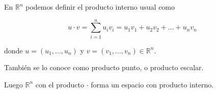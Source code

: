 \begin{example}

En $ \mathbb{R}^n$ podemos definir el producto interno usual como

$$ u \cdot v = \sum_{i=1}^n u_i v_i = u_1 v_1 + u_2 v_2 + \ldots + u_n v_n$$

donde $ u=(u_1, \ldots, u_n)$ y $ v = (v_1, \ldots, v_n) \in \mathbb{R}^n$.

También se lo conoce como producto punto, o producto escalar.

Luego $\mathbb{R}^n$ con el producto $\cdot$ forma un espacio con producto interno.  
\end{example}